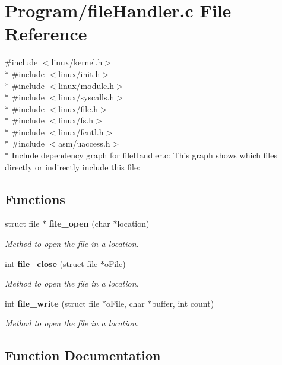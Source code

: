 \section{Program/file\-Handler.c File Reference}
\label{file_handler_8c}
{\ttfamily \#include $<$linux/kernel.\-h$>$}\\*
{\ttfamily \#include $<$linux/init.\-h$>$}\\*
{\ttfamily \#include $<$linux/module.\-h$>$}\\*
{\ttfamily \#include $<$linux/syscalls.\-h$>$}\\*
{\ttfamily \#include $<$linux/file.\-h$>$}\\*
{\ttfamily \#include $<$linux/fs.\-h$>$}\\*
{\ttfamily \#include $<$linux/fcntl.\-h$>$}\\*
{\ttfamily \#include $<$asm/uaccess.\-h$>$}\\*
Include dependency graph for file\-Handler.\-c\-:
This graph shows which files directly or indirectly include this file\-:
\subsection*{Functions}
\begin{DoxyCompactItemize}
\item 
struct file $\ast$ {\bf file\-\_\-open} (char $\ast$location)
\begin{DoxyCompactList}\small\item\em Method to open the file in a location. \end{DoxyCompactList}\item 
int {\bf file\-\_\-close} (struct file $\ast$o\-File)
\begin{DoxyCompactList}\small\item\em Method to open the file in a location. \end{DoxyCompactList}\item 
int {\bf file\-\_\-write} (struct file $\ast$o\-File, char $\ast$buffer, int count)
\begin{DoxyCompactList}\small\item\em Method to open the file in a location. \end{DoxyCompactList}\end{DoxyCompactItemize}


\subsection{Function Documentation}
